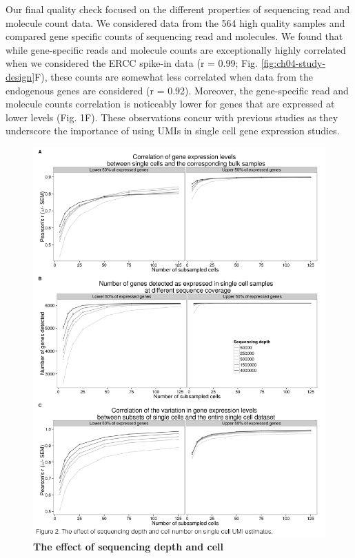 Our final quality check focused on the different properties of
sequencing read and molecule count data. We considered data from the 564
high quality samples and compared gene specific counts of sequencing
read and molecules. We found that while gene-specific reads and molecule
counts are exceptionally highly correlated when we considered the ERCC
spike-in data (r = 0.99; Fig. \ref{fig:ch04-study-design}F), these counts are somewhat less
correlated when data from the endogenous genes are considered (r =
0.92). Moreover, the gene-specific read and molecule counts correlation
is noticeably lower for genes that are expressed at lower levels (Fig.
1F). These observations concur with previous studies \citep{Islam2014,
Grun2014} as they underscore the importance of using UMIs in single
cell gene expression studies.

\begin{figure}[htbp]
\centering
\includegraphics[trim=0 .3in 0 0,clip,width=5in]{img/ch04/Figure02.jpeg}
\caption[The effect of sequencing depth and cell
number on single cell UMI estimates.]{\textbf{The effect of sequencing depth and cell
}}
\end{figure}
